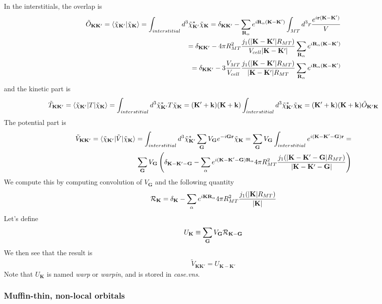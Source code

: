 \documentclass[aps,prb,floatfix,epsfig,singlecolumn,showpacs,preprintnumbers]{revtex4}
\newcommand{\vR}{{\mathbf{R}}}
\renewcommand{\vr}{{\mathbf{r}}}
\newcommand{\vk}{{\mathbf{k}}}
\newcommand{\vK}{{\mathbf{K}}}
\newcommand{\vG}{{\mathbf{G}}}
\newcommand{\cR}{{\cal R}}
\begin{document}
In the interstitials, the overlap is
\begin{eqnarray}
\tilde{O}_{\vK\vK'}=\braket{\tilde{\chi}_{\vK'}|\tilde{\chi}_\vK}=\int_{interstitial} d^3 \tilde{\chi}^*_{\vK'}  \tilde{\chi}_\vK =  
\delta_{\vK\vK'}- \sum_{\vR_\alpha} e^{i\vR_\alpha(\vK-\vK')}
\int_{MT}d^3r \frac{e^{i\vr(\vK-\vK')}}{V}\\
=
\delta_{\vK\vK'}- 
 4\pi R_{MT}^2 \frac{j_1(|\vK-\vK'|R_{MT})}{V_{cell}|\vK-\vK'|}\sum_{\vR_\alpha} e^{i\vR_\alpha(\vK-\vK')} 
\\
=\delta_{\vK\vK'}-  3 \frac{V_{MT}}{V_{cell}} \frac{j_1(|\vK-\vK'|R_{MT})}{|\vK-\vK'|R_{MT}}\sum_{\vR_\alpha} e^{i\vR_\alpha(\vK-\vK')} 
\end{eqnarray}
and the kinetic part is
\begin{eqnarray}
\tilde{T}_{\vK\vK'}=\braket{\tilde{\chi}_{\vK'}|T|\tilde{\chi}_\vK}=\int_{interstitial} d^3 \tilde{\chi}^*_{\vK'}
  T\tilde{\chi}_\vK =  (\vK'+\vk)(\vK+\vk) \int_{interstitial} d^3
  \tilde{\chi}^*_{\vK'}  \tilde{\chi}_\vK=
(\vK'+\vk)(\vK+\vk) \tilde{O}_{\vK'\vK}
\end{eqnarray}
The potential part is
\begin{eqnarray}
\tilde{V}_{\vK\vK'}=\braket{\tilde{\chi}_{\vK'}|\tilde{V}|\tilde{\chi}_\vK}=
\int_{interstitial} d^3 \tilde{\chi}^*_{\vK'}
  \sum_{\vG} V_{\vG}e^{-i\vG\vr}\tilde{\chi}_\vK = 
\sum_\vG  V_{\vG} \int_{interstitial}
e^{i(\vK-\vK'-\vG)\vr}=\\
\sum_{\vG}  V_{\vG} 
\left(\delta_{\vK-\vK'-\vG}-
\sum_\alpha e^{i(\vK-\vK'-\vG)\vR_\alpha}
4\pi R_{MT}^2 \frac{j_1(|\vK-\vK'-\vG|R_{MT})}{|\vK-\vK'-\vG|}
\right)
\end{eqnarray}
We compute this by computing convolution of $V_\vG$ and the following
quantity
\begin{eqnarray}
\cR_\vK = \delta_{\vK}-\sum_\alpha e^{i\vK\vR_\alpha}4\pi R_{MT}^2 \frac{j_1(|\vK|R_{MT})}{|\vK|}
\end{eqnarray}
Let's define
\begin{eqnarray}
U_\vK \equiv \sum_\vG V_\vG \cR_{\vK-\vG}
\end{eqnarray}
We then see that the result is
\begin{eqnarray}
\tilde{V}_{\vK\vK'}= U_{\vK-\vK'}
\end{eqnarray}
Note that $U_\vK$ is named \textit{warp} or \textit{warpin}, and is
stored in \textit{case.vns}.

\subsubsection{Muffin-thin, non-local orbitals}
\end{document}
